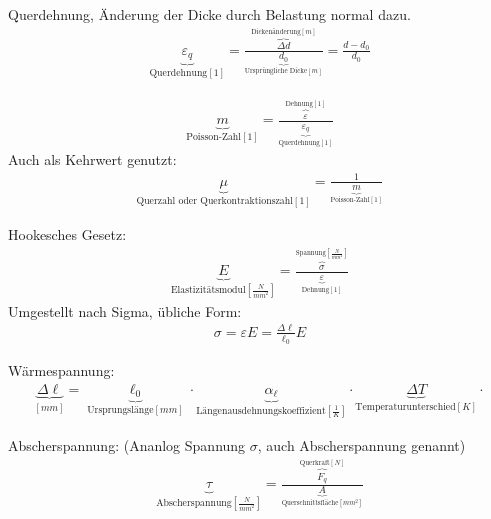 \documentclass[11pt]{article}
\newcommand{\1}{ {\mathds{1}} }
\begin{document}
    Querdehnung, Änderung der Dicke durch Belastung normal dazu.
    \begin{align*}
        \underbrace{\varepsilon_q}_{\text{Querdehnung} \left[1\right]} 
        =
        \frac{\overbrace{\Delta d}^{\text{Dickenänderung}\left[m\right]}}{\underbrace{d_0}_{\text{Ursprüngliche Dicke} \left[m\right]}}
        = \frac{d - d_0}{d_0}
    \end{align*}    

    \hrulefill
    \begin{align*}
        \underbrace{m}_{\text{Poisson-Zahl}[1]} = \frac{\overbrace{\varepsilon}^{\text{Dehnung} [1]}}{\underbrace{\varepsilon_q}_{\text{Querdehnung}[1]}}
    \end{align*}
    Auch als Kehrwert genutzt:
        \begin{align*}
        \underbrace{\mu}_{\text{Querzahl oder Querkontraktionszahl}[1]} = \frac{1}{\underbrace{m}_{\text{Poisson-Zahl}[1]}}
    \end{align*}

    \hrulefill
        
    Hookesches Gesetz:
    \begin{align*}
        \underbrace{E}_{\text{Elastizitätsmodul}\left[\frac{N}{mm^2}\right]}
        =
        \frac{\overbrace{\sigma}^{\text{Spannung}\left[\frac{N}{mm^2}\right]}}
        {\underbrace{\varepsilon}_{\text{Dehnung}\left[1\right]}}
    \end{align*}
Umgestellt nach Sigma, übliche Form:
    \begin{align*}
        \sigma
        =
        \varepsilon E
        =
        \frac{\Delta \ell}{\ell_0}E
    \end{align*}
    \hrulefill

    Wärmespannung:
    \begin{align*}
        \underbrace{\Delta \ell}_{\left[ mm \right]}
        =
        \underbrace{\ell_0}_{\text{Ursprungslänge}\left[mm\right]} \cdot
        \underbrace{\alpha_{\ell}}_{\text{Längenausdehnungskoeffizient}\left[\frac{1}{K}\right]} \cdot
        \underbrace{\Delta T}_{\text{Temperaturunterschied}\left[K\right]} \cdot
    \end{align*}
    \hrulefill

    Abscherspannung: (Ananlog Spannung $\sigma$, auch Abscherspannung genannt)
    \begin{align*}
        \underbrace{\tau}_{\text{Abscherspannung}\left[\frac{N}{mm^2}\right]}
        =
        \frac{\overbrace{F_q}^{\text{Querkraft}\left[N\right]}}
             {\underbrace{A}_{\text{Querschnittsfläche}\left[mm^2\right]}}
    \end{align*}
    
\end{document}
